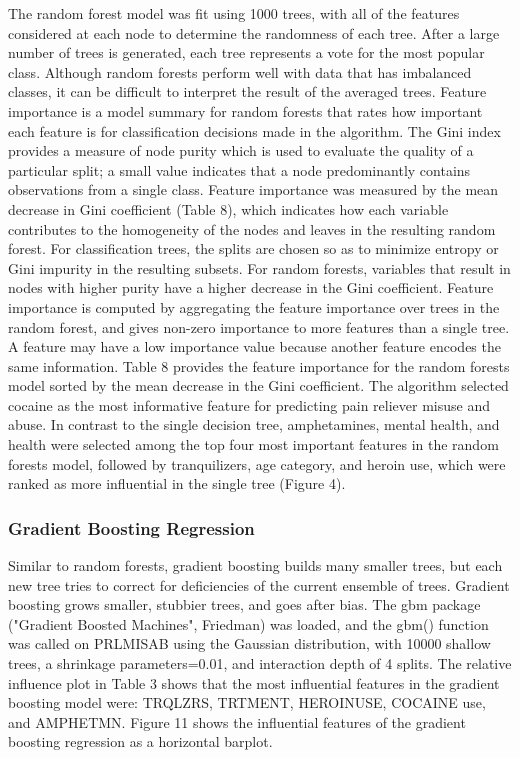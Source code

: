 \documentclass[sigconf]{acmart}
\begin{document}
The random forest model was fit using 1000 trees, with all of the features 
considered at each node to determine the randomness of each tree. After a 
large number of trees is generated, each tree represents a vote for the
most popular class. Although random forests perform well with data that has
imbalanced classes, it can be difficult to interpret the result of the 
averaged trees. Feature importance is a model summary for random forests 
that rates how important each feature is for classification decisions made 
in the algorithm. The Gini index provides a measure of node purity which is 
used to evaluate the quality of a particular split; a small value indicates 
that a node predominantly contains observations from a single class. 
Feature importance was measured by the mean decrease in Gini coefficient 
(Table 8), which indicates how each variable contributes to the homogeneity 
of the nodes and leaves in the resulting random forest. For classification 
trees, the splits are chosen so as to minimize entropy or Gini impurity in 
the resulting subsets. For random forests, variables that result in nodes 
with higher purity have a higher decrease in the Gini coefficient. Feature 
importance is computed by aggregating the feature importance over trees in 
the random forest, and gives non-zero importance to more features than a 
single tree. A feature may have a low importance value because another feature 
encodes the same information. Table 8 provides the feature importance for 
the random forests model sorted by the mean decrease in the Gini coefficient. 
The algorithm selected cocaine as the most informative feature for predicting 
pain reliever misuse and abuse. In contrast to the single decision tree, 
amphetamines, mental health, and health were selected among the top four most 
important features in the random forests model, followed by tranquilizers, 
age category, and heroin use, which were ranked as more influential in the 
single tree (Figure 4). 


\subsubsection{Gradient Boosting Regression}

Similar to random forests, gradient boosting builds many smaller trees, but 
each new tree tries to correct for deficiencies of the current ensemble of 
trees. Gradient boosting grows smaller, stubbier trees, and goes after bias. 
The gbm package ("Gradient Boosted Machines", Friedman) was loaded, and the 
gbm() function was called on PRLMISAB using the Gaussian distribution, with
10000 shallow trees, a shrinkage parameters=0.01, and interaction depth of 
4 splits. The relative influence plot in Table 3 shows that the most 
influential features in the gradient boosting model were: TRQLZRS, TRTMENT,
HEROINUSE, COCAINE use, and AMPHETMN. Figure 11 shows the influential 
features of the gradient boosting regression as a horizontal barplot. 
\end{document}
